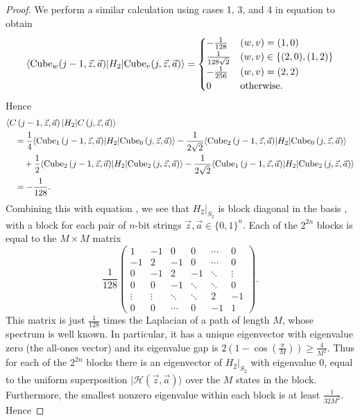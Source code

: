 \documentclass[../thesis-main/thesis-main]{subfiles}
\begin{document}
\begin{proof}
We perform a similar calculation using cases 1, 3, and 4 in equation  to obtain
\begin{equation}
\langle{\operatorname{Cube}_{w}(j-1,\vec{z},\vec{a})}|H_{2}|{\operatorname{Cube}_{v}(j,\vec{z},\vec{a})}\rangle=\begin{cases}
-\frac{1}{128} & (w,v)=(1,0)\\
\frac{1}{128\sqrt{2}} & (w,v)\in\{(2,0),(1,2)\}\\
-\frac{1}{256} & (w,v)=(2,2)\\
0 & \text{otherwise.}
\end{cases}
\end{equation}
Hence 
\begin{align}
 & \langle C\left(j-1,\vec{z},\vec{a}\right)|H_{2}|C\left(j,\vec{z},\vec{a}\right)\rangle\\
 &\quad =\frac{1}{4}\langle{\operatorname{Cube}_{1}\left(j-1,\vec{z},\vec{a}\right)}|H_{2}|{\operatorname{Cube}_{0}\left(j,\vec{z},\vec{a}\right)}\rangle-\frac{1}{2\sqrt{2}}\langle{\operatorname{Cube}_{2}\left(j-1,\vec{z},\vec{a}\right)}|H_{2}|{\operatorname{Cube}_{0}\left(j,\vec{z},\vec{a}\right)}\rangle\\
 &\qquad +\frac{1}{2}\langle{\operatorname{Cube}_{2}\left(j-1,\vec{z},\vec{a}\right)}|H_{2}|{\operatorname{Cube}_{2}\left(j,\vec{z},\vec{a}\right)}\rangle-\frac{1}{2\sqrt{2}}\langle{\operatorname{Cube}_{1}\left(j-1,\vec{z},\vec{a}\right)}|H_{2}|{\operatorname{Cube}_{2}\left(j,\vec{z},\vec{a}\right)}\rangle\\
 &\quad =-\frac{1}{128}.
\end{align}
Combining this with equation , we see that $H_{2}|_{S_{2}}$ is block diagonal in the basis , with a block for each pair of $n$-bit strings $\vec{z},\vec{a}\in\{0,1\}^{n}$. Each of the $2^{2n}$ blocks is equal to the $M\times M$ matrix
\begin{equation}
  \frac{1}{128}
  \begin{pmatrix}
    1 & -1 & 0 & 0 & \cdots & 0  \\
    -1 & 2 & -1 & 0 & \cdots & 0  \\
    0 & -1 & 2 & -1 & \ddots & \vdots \\
    0 & 0 & -1 & \ddots & \ddots & 0 \\
    \vdots & \vdots & \ddots & \ddots & 2 & -1 \\
    0 & 0 & \cdots & 0 & -1 & 1  
  \end{pmatrix}.
\end{equation}
This matrix is just $\frac{1}{128}$ times the Laplacian of a path of length $M$, whose spectrum is well known. In particular, it has a unique eigenvector with eigenvalue zero (the all-ones vector) and its eigenvalue gap is $2(1-\cos (\frac{\pi}{M}))\geq \frac{4}{M^2}$. Thus for each of the $2^{2n}$ blocks there is an eigenvector of $H_{2}|_{S_{2}}$ with eigenvalue $0$, equal to the uniform superposition $|\mathcal{H}(\vec{z},\vec{a})\rangle$ over the $M$ states in the block. Furthermore, the smallest nonzero eigenvalue within each block is at least $\frac{1}{32M^{2}}$. Hence

\end{proof}
\end{document}

